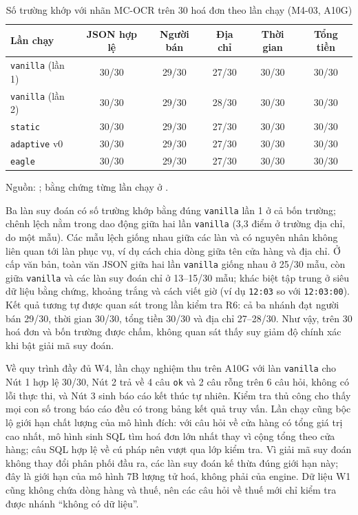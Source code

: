\begin{table}[htbp]
\centering
\caption{Số trường khớp với nhãn MC-OCR trên 30 hoá đơn theo lần chạy (M4-03, A10G)}
\label{tab:m403}
\small
\begin{tabular}{@{}lccccc@{}}
\toprule
\textbf{Lần chạy} & \textbf{JSON hợp lệ} & \textbf{Người bán} & \textbf{Địa chỉ} & \textbf{Thời gian} & \textbf{Tổng tiền} \\
\midrule
\texttt{vanilla} (lần 1) & 30/30 & 29/30 & 27/30 & 30/30 & 30/30 \\
\texttt{vanilla} (lần 2) & 30/30 & 29/30 & 28/30 & 30/30 & 30/30 \\
\texttt{static} & 30/30 & 29/30 & 27/30 & 30/30 & 30/30 \\
\texttt{adaptive} v0 & 30/30 & 29/30 & 27/30 & 30/30 & 30/30 \\
\texttt{eagle} & 30/30 & 29/30 & 27/30 & 30/30 & 30/30 \\
\bottomrule
\end{tabular}

\vspace{2pt}
{\footnotesize Nguồn: ; bằng chứng từng lần chạy ở .}
\end{table}

Ba làn suy đoán có số trường khớp bằng đúng \texttt{vanilla} lần 1 ở cả bốn trường; chênh lệch nằm trong dao động giữa hai lần \texttt{vanilla} (3,3 điểm ở trường địa chỉ, do một mẫu). Các mẫu lệch giống nhau giữa các làn và có nguyên nhân không liên quan tới làn phục vụ, ví dụ cách chia dòng giữa tên cửa hàng và địa chỉ. Ở cấp văn bản, toàn văn JSON giữa hai lần \texttt{vanilla} giống nhau ở 25/30 mẫu, còn giữa \texttt{vanilla} và các làn suy đoán chỉ ở 13--15/30 mẫu; khác biệt tập trung ở siêu dữ liệu bằng chứng, khoảng trắng và cách viết giờ (ví dụ \texttt{12:03} so với \texttt{12:03:00}). Kết quả tương tự được quan sát trong lần kiểm tra R6: cả ba nhánh đạt người bán 29/30, thời gian 30/30, tổng tiền 30/30 và địa chỉ 27--28/30. Như vậy, trên 30 hoá đơn và bốn trường được chấm, không quan sát thấy suy giảm độ chính xác khi bật giải mã suy đoán.

Về quy trình đầy đủ W4, lần chạy nghiệm thu trên A10G với làn \texttt{vanilla} cho Nút 1 hợp lệ 30/30, Nút 2 trả về 4 câu \texttt{ok} và 2 câu rỗng trên 6 câu hỏi, không có lỗi thực thi, và Nút 3 sinh báo cáo kết thúc tự nhiên. Kiểm tra thủ công cho thấy mọi con số trong báo cáo đều có trong bảng kết quả truy vấn. Lần chạy cũng bộc lộ giới hạn chất lượng của mô hình đích: với câu hỏi về cửa hàng có tổng giá trị cao nhất, mô hình sinh SQL tìm hoá đơn lớn nhất thay vì cộng tổng theo cửa hàng; câu SQL hợp lệ về cú pháp nên vượt qua lớp kiểm tra. Vì giải mã suy đoán không thay đổi phân phối đầu ra, các làn suy đoán kế thừa đúng giới hạn này; đây là giới hạn của mô hình 7B lượng tử hoá, không phải của engine. Dữ liệu W1 cũng không chứa dòng hàng và thuế, nên các câu hỏi về thuế mới chỉ kiểm tra được nhánh ``không có dữ liệu''.

